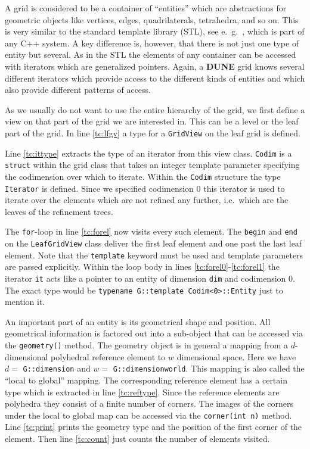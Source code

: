\documentclass[11pt,a4paper,headinclude,footinclude,DIV16,normalheadings]{scrreprt}
\newcommand{\Dune}{{\sf\bfseries DUNE}\xspace}
\begin{document}
A grid is considered to be a container of ``entities'' which are
abstractions for geometric objects like vertices, edges,
quadrilaterals, tetrahedra, and so on. This is very similar to the
standard template library (STL), see e.~g.~\cite{Stroustrup},
which is part of any C++ system. 
A key difference is, however, that there is not just one type of entity but
several. As in the STL the elements of any container can be accessed
with iterators which are generalized pointers. Again, a \Dune{} grid
knows several different iterators which provide access to the
different kinds of entities and which also provide different patterns
of access.

As we usually do not want to use the entire hierarchy of the grid, we first
define a view on that part of the grid we are interested in. This can be a
level or the leaf part of the grid. In line \ref{tc:lfgv} a type for a
\lstinline!GridView! on the leaf grid is defined.

Line \ref{tc:ittype} extracts the type of an iterator from this view 
class. \lstinline!Codim! is a \lstinline!struct! within the grid class
that takes an integer template parameter specifying the codimension
over which to iterate. Within the \lstinline!Codim! structure the type
\lstinline!Iterator! is defined. Since we specified codimension 0
this iterator is used to iterate
over the elements which are not refined any further, i.e.~which are
the leaves of the refinement trees.

The \lstinline!for!-loop in line \ref{tc:forel} now visits every such
element. The \lstinline!begin! and \lstinline!end! on the
\lstinline!LeafGridView!
class deliver the first leaf element and one past the last leaf element. Note
that the \lstinline!template! keyword must be used and template parameters are
passed explicitly. Within the loop body in
lines \ref{tc:forel0}-\ref{tc:forel1} the iterator \lstinline!it! acts
like a pointer to an entity of dimension \lstinline!dim! and
codimension 0. The exact type would be
\lstinline!typename G::template Codim<0>::Entity! just to mention it.

An important part of an entity is its geometrical shape and position.
All geometrical information is factored out into a sub-object that can
be accessed via the \lstinline!geometry()!  method. The geometry
object is in general a mapping from a $d$-dimensional polyhedral
reference element to $w$ dimensional space. Here we have $d=$
\lstinline!G::dimension! and $w=$ \lstinline!G::dimensionworld!. This
mapping is also called the ``local to global'' mapping.  The
corresponding reference element has a certain type which is extracted
in line \ref{tc:reftype}. Since the reference elements are polyhedra
they consist of a finite number of corners. The images of the corners
under the local to global map can be accessed via the
\lstinline!corner(int n)! method. Line \ref{tc:print} prints the geometry type
and the position of the first corner of the element. Then line
\ref{tc:count} just counts the number of elements visited.
\end{document}
